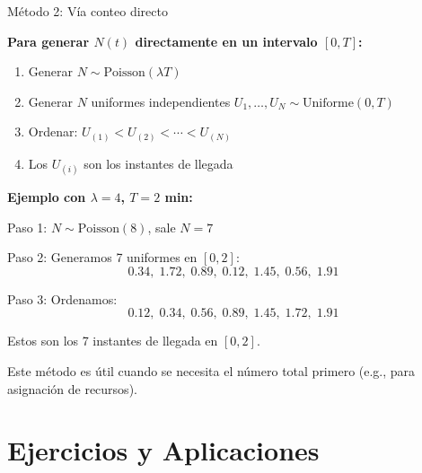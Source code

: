 \documentclass[aspectratio=1610, 9pt]{beamer}
\begin{document}
\begin{frame}{M\'{e}todo 2: V\'{i}a conteo directo}

\textbf{Para generar $N(t)$ directamente en un intervalo $[0, T]$:}

\vspace{0.2cm}
\begin{enumerate}
    \item Generar $N \sim \text{Poisson}(\lambda T)$
    \item Generar $N$ uniformes independientes $U_1, \ldots, U_N \sim \text{Uniforme}(0, T)$
    \item Ordenar: $U_{(1)} < U_{(2)} < \cdots < U_{(N)}$
    \item Los $U_{(i)}$ son los instantes de llegada
\end{enumerate}

\vspace{0.3cm}
\textbf{Ejemplo con $\lambda = 4$, $T = 2$ min:}

\vspace{0.2cm}
Paso 1: $N \sim \text{Poisson}(8)$, sale $N = 7$

Paso 2: Generamos 7 uniformes en $[0, 2]$:
\[
0.34, \; 1.72, \; 0.89, \; 0.12, \; 1.45, \; 0.56, \; 1.91
\]

Paso 3: Ordenamos:
\[
0.12, \; 0.34, \; 0.56, \; 0.89, \; 1.45, \; 1.72, \; 1.91
\]

Estos son los 7 instantes de llegada en $[0, 2]$.

Este m\'{e}todo es \'{u}til cuando se necesita el n\'{u}mero total primero (e.g., para asignaci\'{o}n de recursos).
\end{frame}

\section{Ejercicios y Aplicaciones}
\end{document}
